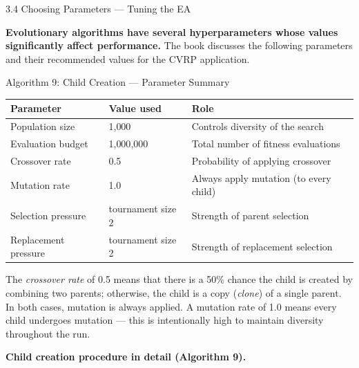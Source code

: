 \documentclass[aspectratio=169,10pt]{beamer}
\begin{document}
\begin{frame}[allowframebreaks]{3.4 Choosing Parameters — Tuning the EA}

  \textbf{Evolutionary algorithms have several hyperparameters whose values significantly
  affect performance.}
  The book discusses the following parameters and their recommended values for the CVRP application.

  \medskip
  \begin{block}{Algorithm 9: Child Creation — Parameter Summary}
    \begin{tabular}{lll}
      \toprule
      \textbf{Parameter} & \textbf{Value used} & \textbf{Role} \\
      \midrule
      Population size        & 1{,}000    & Controls diversity of the search \\
      Evaluation budget      & 1{,}000{,}000 & Total number of fitness evaluations \\
      Crossover rate         & 0.5        & Probability of applying crossover \\
      Mutation rate          & 1.0        & Always apply mutation (to every child) \\
      Selection pressure     & tournament size 2 & Strength of parent selection \\
      Replacement pressure   & tournament size 2 & Strength of replacement selection \\
      \bottomrule
    \end{tabular}
  \end{block}

  The \emph{crossover rate} of 0.5 means that there is a 50\% chance the child is created
  by combining two parents; otherwise, the child is a copy (\emph{clone}) of a single parent.
  In both cases, mutation is always applied.
  A mutation rate of 1.0 means every child undergoes mutation — this is intentionally high
  to maintain diversity throughout the run.

  \framebreak

  \textbf{Child creation procedure in detail (Algorithm 9).}


\end{frame}
\end{document}
